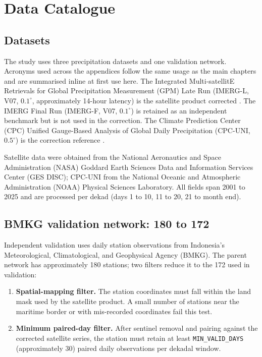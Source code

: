 \chapter{Data Catalogue}\label{app:data}

\section{Datasets}

The study uses three precipitation datasets and one validation
network. Acronyms used across the appendices follow the same usage
as the main chapters and are summarised inline at first use here.
The Integrated Multi-satellitE Retrievals for Global Precipitation
Measurement (GPM) Late Run (IMERG-L, V07, $0.1^{\circ}$,
approximately 14-hour latency) is the satellite product corrected
\citep{ref:huffman2020}. The IMERG Final Run (IMERG-F, V07,
$0.1^{\circ}$) is retained as an independent benchmark but is not
used in the correction. The Climate Prediction Center (CPC)
Unified Gauge-Based Analysis of Global Daily Precipitation
(CPC-UNI, $0.5^{\circ}$) is the correction reference
\citep{ref:chen2008}.

Satellite data were obtained from the
National Aeronautics and Space Administration (NASA) Goddard Earth
Sciences Data and Information Services Center (GES DISC); CPC-UNI
from the National Oceanic and Atmospheric Administration (NOAA)
Physical Sciences Laboratory. All fields span 2001 to 2025 and are
processed per dekad (days 1 to 10, 11 to 20, 21 to month end).

\section{BMKG validation network: 180 to 172}

Independent validation uses daily station observations from
Indonesia's Meteorological, Climatological, and Geophysical Agency
(BMKG). The parent network has approximately 180 stations; two
filters reduce it to the 172 used in validation:

\begin{enumerate}
    \item \textbf{Spatial-mapping filter.} The station coordinates
    must fall within the land mask used by the satellite product.
    A small number of stations near the maritime border or with
    mis-recorded coordinates fail this test.
    \item \textbf{Minimum paired-day filter.} After sentinel
    removal and pairing against the corrected satellite series,
    the station must retain at least \texttt{MIN\_VALID\_DAYS}
    (approximately 30) paired daily observations per dekadal
    window.
\end{enumerate}

